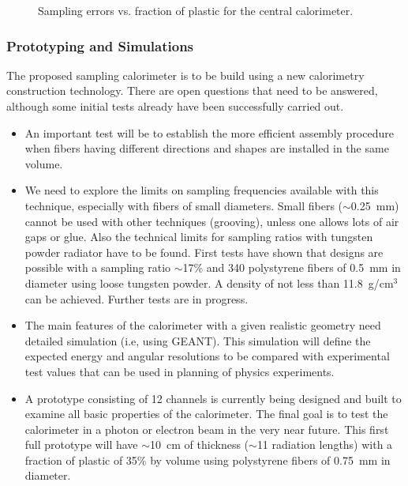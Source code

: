 \begin{figure}
\vspace{9.0cm} 
\caption{\small{Sampling errors vs. fraction of plastic for the central
calorimeter.}}
\label{errvol6}
\end{figure}

\subsubsection{Prototyping and Simulations}

The proposed sampling calorimeter is to be build using a new calorimetry 
construction technology.  There are open questions that need to be answered, 
although some initial tests already have been successfully carried out.

\begin{itemize}
 
\item An important test will be to establish the more efficient assembly 
procedure when fibers having different directions and shapes are installed 
in the same volume.
 
\item We need to explore the limits on sampling frequencies available with 
this technique, especially with fibers of small diameters. Small fibers 
($\sim$0.25~mm) cannot be used with other techniques (grooving), unless one 
allows lots of air gaps or glue. Also the technical limits for 
sampling ratios with tungsten powder radiator have to be found. First tests 
have shown that designs are possible with a sampling ratio $\sim$17\% and 
340 polystyrene fibers of 0.5~mm in diameter using loose tungsten powder. 
A density of not less than 11.8~g/cm$^3$ can be achieved.  Further tests are 
in progress.

\item The main features of the calorimeter with a given realistic geometry 
need detailed simulation (i.e, using GEANT). This simulation will define 
the expected energy and angular resolutions to be compared with experimental 
test values that can be used in planning of physics experiments.

\item A prototype consisting of 12 channels is currently being designed and 
built to examine all basic properties of the calorimeter. The final goal is 
to test the calorimeter in a photon or electron beam in the very near 
future.  This first full prototype will have $\sim$10~cm of thickness 
($\sim$11 radiation lengths) with a fraction of plastic of 35\% by volume 
using polystyrene fibers of 0.75~mm in diameter.

\end{itemize}

%



